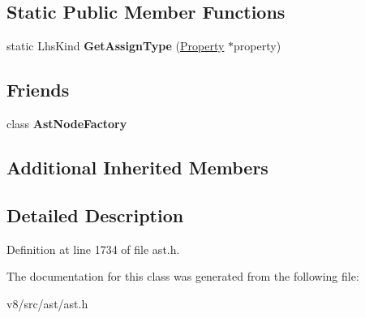 \subsection*{Static Public Member Functions}
\begin{DoxyCompactItemize}
\item 
\mbox{\label{classv8_1_1internal_1_1Property_a486a48791aa86bd221434941785de724}} 
static Lhs\+Kind {\bfseries Get\+Assign\+Type} (\mbox{\hyperlink{classv8_1_1internal_1_1Property}{Property}} $\ast$property)
\end{DoxyCompactItemize}
\subsection*{Friends}
\begin{DoxyCompactItemize}
\item 
\mbox{\label{classv8_1_1internal_1_1Property_a8d587c8ad3515ff6433eb83c578e795f}} 
class {\bfseries Ast\+Node\+Factory}
\end{DoxyCompactItemize}
\subsection*{Additional Inherited Members}


\subsection{Detailed Description}


Definition at line 1734 of file ast.\+h.



The documentation for this class was generated from the following file\+:\begin{DoxyCompactItemize}
\item 
v8/src/ast/ast.\+h\end{DoxyCompactItemize}
